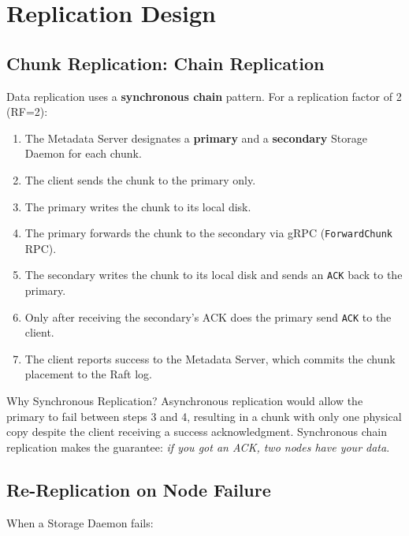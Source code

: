 \documentclass[12pt,a4paper]{article}
\begin{document}
\section{Replication Design}

\subsection{Chunk Replication: Chain Replication}

Data replication uses a \textbf{synchronous chain} pattern. For a replication factor of 2 (RF=2):

\begin{enumerate}[leftmargin=2em]
  \item The Metadata Server designates a \textbf{primary} and a \textbf{secondary} Storage Daemon for each chunk.
  \item The client sends the chunk to the primary only.
  \item The primary writes the chunk to its local disk.
  \item The primary forwards the chunk to the secondary via gRPC (\texttt{ForwardChunk} RPC).
  \item The secondary writes the chunk to its local disk and sends an \texttt{ACK} back to the primary.
  \item Only after receiving the secondary's ACK does the primary send \texttt{ACK} to the client.
  \item The client reports success to the Metadata Server, which commits the chunk placement to the Raft log.
\end{enumerate}

\begin{warningbox}{Why Synchronous Replication?}
Asynchronous replication would allow the primary to fail between steps 3 and 4, resulting in a chunk with only one physical copy despite the client receiving a success acknowledgment. Synchronous chain replication makes the guarantee: \emph{if you got an ACK, two nodes have your data}.
\end{warningbox}

\subsection{Re-Replication on Node Failure}

When a Storage Daemon fails:
\end{document}
